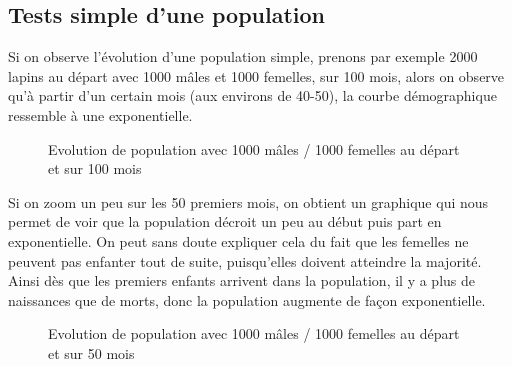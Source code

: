 \documentclass{article}
\begin{document}
\subsection{Tests simple d'une population}
Si on observe l'évolution d'une population simple, prenons par exemple 2000 lapins au départ avec
1000 mâles et 1000 femelles, sur 100 mois, alors on observe qu'à partir d'un certain mois
(aux environs de 40-50), la courbe démographique ressemble à une exponentielle.

\begin{center}
  \centering
  \begin{figure}[h]
  \caption{Evolution de population avec 1000 mâles / 1000 femelles au départ et sur 100 mois}
\end{figure}
\end{center}

\newpage
Si on zoom un peu sur les 50 premiers mois, on obtient un graphique qui nous permet de voir
que la population décroit un peu au début puis part en exponentielle. On peut sans doute
expliquer cela du fait que les femelles ne peuvent pas enfanter tout de suite, puisqu'elles
doivent atteindre la majorité. Ainsi dès que les premiers enfants arrivent dans la population,
il y a plus de naissances que de morts, donc la population augmente  de façon exponentielle.

\begin{center}
\begin{figure}[!h]
\caption{Evolution de population avec 1000 mâles / 1000 femelles au départ et sur 50 mois}
\end{figure}
\end{center}
\end{document}
